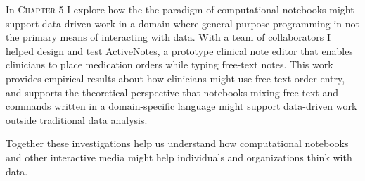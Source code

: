 In \textsc{Chapter 5} I explore how the the paradigm of computational notebooks might support data-driven work in a domain where general-purpose programming in not the primary means of interacting with data. With a team of collaborators I helped design and test ActiveNotes, a prototype clinical note editor that enables clinicians to place medication orders while typing free-text notes. This work provides empirical results about how clinicians might use free-text order entry, and supports the theoretical perspective that notebooks mixing free-text and commands written in a domain-specific language might support data-driven work outside traditional data analysis.

Together these investigations help us understand how computational notebooks and other interactive media might help individuals and organizations think with data.
